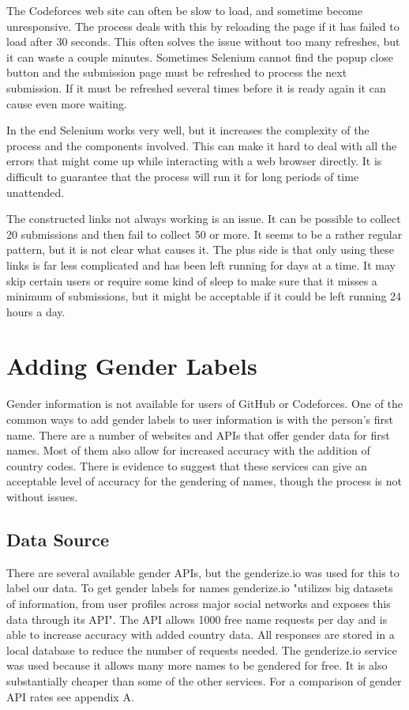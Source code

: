 \documentclass[12pt]{article}
\begin{document}
The Codeforces web site can often be slow to load, and sometime become unresponsive. The process deals with this by reloading the page if it has failed to load after 30 seconds. This often solves the issue without too many refreshes, but it can waste a couple minutes. Sometimes Selenium cannot find the popup close button and the submission page must be refreshed to process the next submission. If it must be refreshed several times before it is ready again it can cause even more waiting.

In the end Selenium works very well, but it increases the complexity of the process and the components involved. This can make it hard to deal with all the errors that might come up while interacting with a web browser directly. It is difficult to guarantee that the process will run it for long periods of time unattended.

The constructed links not always working is an issue. It can be possible to collect 20 submissions and then fail to collect 50 or more. It seems to be a rather regular pattern, but it is not clear what causes it. The plus side is that only using these links is far less complicated and has been left running for days at a time. It may skip certain users or require some kind of sleep to make sure that it misses a minimum of submissions, but it might be acceptable if it could be left running 24 hours a day.



\section{Adding Gender Labels}
Gender information is not available for users of GitHub or Codeforces. One of the common ways to add gender labels to user information is with the person's first name. There are a number of websites and APIs that offer gender data for first names. Most of them also allow for increased accuracy with the addition of country codes. There is evidence to suggest that these services can give an acceptable level of accuracy for the gendering of names, though the process is not without issues\cite{Santamaria2018}.

\subsection{Data Source}
There are several available gender APIs, but the genderize.io was used for this to label our data. To get gender labels for names genderize.io "utilizes big datasets of information, from user profiles across major social networks and exposes this data through its API"\cite{WEBSITE:GENDER1}. The API allows 1000 free name requests per day and is able to increase accuracy with added country data. All responses are stored in a local database to reduce the number of requests needed. The genderize.io service was used because it allows many more names to be gendered for free. It is also substantially cheaper than some of the other services. For a comparison of gender API rates see appendix A.
\end{document}
